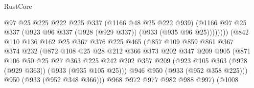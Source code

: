 \begin{lexlean}{RustCore}
\begin{coremodule}
                                    @97
                                    @25
                                    @225
                                    @222
                                    @225
                                    @337
                                    (@1166 @48 @25 @222 @939)
                                    (@1166
                                      @97
                                      @25
                                      @337
                                      (@923 @96 @337 (@928 (@929 @337)) (@933 (@935 @96 @25))))))))
                            (@842
                              @110
                              @136
                              @162
                              @25
                              @367
                              @376
                              @225
                              @465
                              (@857
                                @109
                                @859
                                @861
                                @367
                                @374
                                @232
                                (@872
                                  @108
                                  @25
                                  @28
                                  @212
                                  @366
                                  @373
                                  @202
                                  @347
                                  @209
                                  @905
                                  (@871
                                    @106
                                    @50
                                    @25
                                    @27
                                    @363
                                    @225
                                    @242
                                    @202
                                    @357
                                    @209
                                    (@923 @105 @363 (@928 (@929 @363)) (@933 (@935 @105 @25)))
                                    @946
                                    @950
                                    (@933 (@952 @358 @225)))
                                  @950
                                  (@933 (@952 @348 @366)))
                                @968
                                @972
                                @977
                                @982
                                @988
                                @997)
                              (@1008

\end{coremodule}
\end{lexlean}
